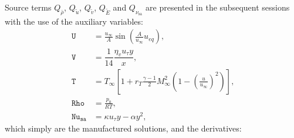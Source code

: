 \documentclass[10pt]{article}
\newcommand{\Rho}{\,\mathtt{Rho}}
\newcommand{\U}{\,\mathtt{U}}
\newcommand{\V}{\,\mathtt{V}}
\newcommand{\Nu}{\,\mathtt{Nu_{sa}}}
\newcommand{\T}{\,\mathtt{T}}
\newcommand{\sa}{\nu_{\mathrm{sa}}}
\newcommand{\brho}{\bar{\rho}}
\newcommand{\tu}{\tilde{u}}
\newcommand{\tv}{\tilde{v}}
\newcommand{\tE}{\tilde{E}}
\begin{document}
Source terms $Q_{\brho}$, $Q_{\tu}$, $Q_{\tv}$, $Q_{\tE}$ and $Q_{\sa}$ are presented in the subsequent sessions with the use of the auxiliary variables:
\begin{equation}
\label{eq:aux_2d}
\begin{split}
\U &= \frac{u_{\infty}}{A} \sin \left( \frac{A}{u_{\infty}} u_{eq} \right),\\
\V &= \dfrac{1}{14} \dfrac{\eta_v u_{\tau} y}{x},\\
\T &= T_{\infty} \left[ 1 + r_T \frac{\gamma - 1}{2} M_{\infty}^2 \left( 1 - \left(\frac{u}{u_{\infty}}\right)^2 \right) \right],\\
\Rho &= \frac{p_0}{R T},\\
\Nu &= \kappa u_{\tau} y - \alpha y^2,
\end{split}
\end{equation}
which simply are the manufactured solutions, and the derivatives: 
\end{document}
